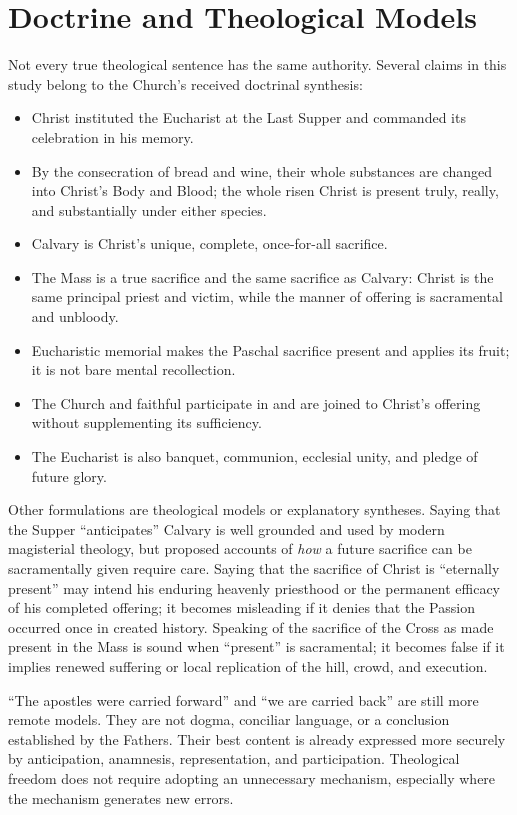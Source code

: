 \section{Doctrine and Theological Models}

Not every true theological sentence has the same authority. Several claims in
this study belong to the Church's received doctrinal synthesis:

\begin{itemize}
  \item Christ instituted the Eucharist at the Last Supper and commanded its
  celebration in his memory.
  \item By the consecration of bread and wine, their whole substances are
  changed into Christ's Body and Blood; the whole risen Christ is present
  truly, really, and substantially under either species.
  \item Calvary is Christ's unique, complete, once-for-all sacrifice.
  \item The Mass is a true sacrifice and the same sacrifice as Calvary: Christ
  is the same principal priest and victim, while the manner of offering is
  sacramental and unbloody.
  \item Eucharistic memorial makes the Paschal sacrifice present and applies
  its fruit; it is not bare mental recollection.
  \item The Church and faithful participate in and are joined to Christ's
  offering without supplementing its sufficiency.
  \item The Eucharist is also banquet, communion, ecclesial unity, and pledge
  of future glory.
\end{itemize}

Other formulations are theological models or explanatory syntheses. Saying
that the Supper ``anticipates'' Calvary is well grounded and used by modern
magisterial theology, but proposed accounts of \emph{how} a future sacrifice
can be sacramentally given require care. Saying that the sacrifice of Christ
is ``eternally present'' may intend his enduring heavenly priesthood or the
permanent efficacy of his completed offering; it becomes misleading if it
denies that the Passion occurred once in created history. Speaking of the
sacrifice of the Cross as made present in the Mass is sound when ``present''
is sacramental; it
becomes false if it implies renewed suffering or local replication of the
hill, crowd, and execution.

``The apostles were carried forward'' and ``we are carried back'' are still
more remote models. They are not dogma, conciliar language, or a conclusion
established by the Fathers. Their best content is already expressed more
securely by anticipation, anamnesis, representation, and participation.
Theological freedom does not require adopting an unnecessary mechanism,
especially where the mechanism generates new errors.

